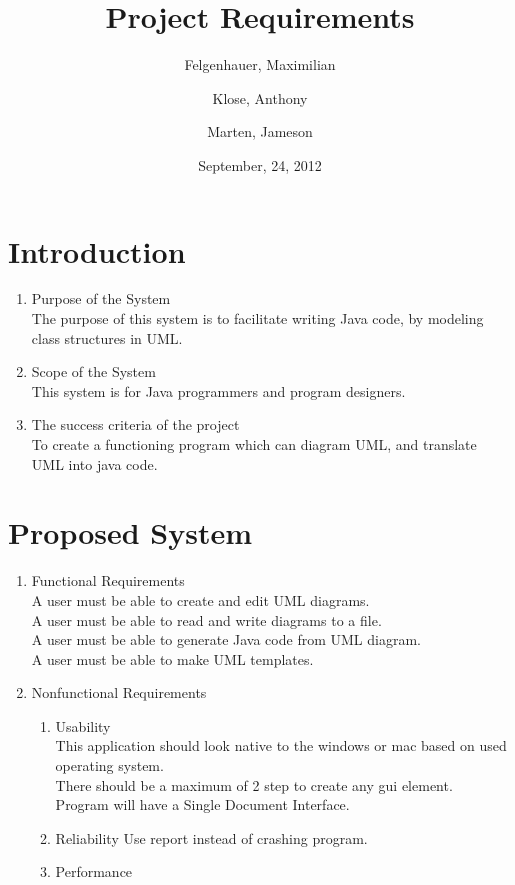 \documentclass[a4paper, 12pt]{article}
\begin{document}
\title{Project Requirements}
\author{Felgenhauer, Maximilian\\
	\and
	Klose, Anthony\\
	\and
	Marten, Jameson}
\date{September, 24, 2012}

\maketitle

\section{Introduction}

\begin{enumerate}
	\item{Purpose of the System}\\ 
		The purpose of this system is to facilitate writing Java code, by modeling class structures in UML.

	\item{Scope of the System}\\
		This system is for Java programmers and program designers.

	\item{The success criteria of the project}\\
		To create a functioning program which can diagram UML, and translate UML into java code.
\end{enumerate}

\section{Proposed System}

\begin{enumerate}
	\item{Functional Requirements}\\
		A user must be able to create and edit UML diagrams.\\
		A user must be able to read and write diagrams to a file.\\
		A user must be able to generate Java code from UML diagram.\\
		A user must be able to make UML templates.\\

	\item{Nonfunctional Requirements}
	\begin{enumerate}
		\item{Usability}\\
			This application should look native to the windows or mac based on used operating system.\\
			There should be a maximum of 2 step to create any gui element. \\
			Program will have a Single Document Interface.\\

		\item{Reliability}
			Use report instead of crashing program.\\

		\item{Performance}
	\end{enumerate}
\end{enumerate}
\end{document}
